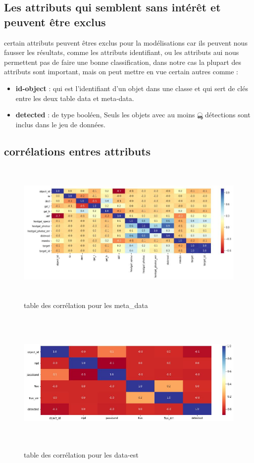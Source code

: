 \subsection{Les attributs qui semblent sans intérêt et peuvent être exclus}
certain attributs peuvent êtres exclus pour la modélisations car ils peuvent nous fausser les résultats, comme les attributs identifiant, ou les attributs aui nous permettent pas de faire une bonne classification, dans notre cas la plupart des attributs sont important, mais on peut mettre en vue certain autres comme :
\begin{itemize}
    \item \textbf{id-object }: qui est l’identifiant d’un objet dans une classe et qui sert de clés entre les deux table data et meta-data.
    \item \textbf{detected }: de type booléen, Seuls les objets avec au moins ൣ détections sont inclus
dans le jeu de données.
\end{itemize}
\subsection{corrélations entres attributs}
\newline
\begin{figure}[!h]
    \centering
    \includegraphics[width=12cm,height=7cm]{report/figures/correlation.jpg}
    \caption{table des corrélation pour les meta_data}
    \label{fig:my_label}
\end{figure}


\begin{figure}[!h]
    \centering
    \includegraphics[width=12cm,height=7cm]{report/figures/correlation1.jpg}
    \caption{table des corrélation pour les data-est}
    \label{fig:my_label}
\end{figure}



